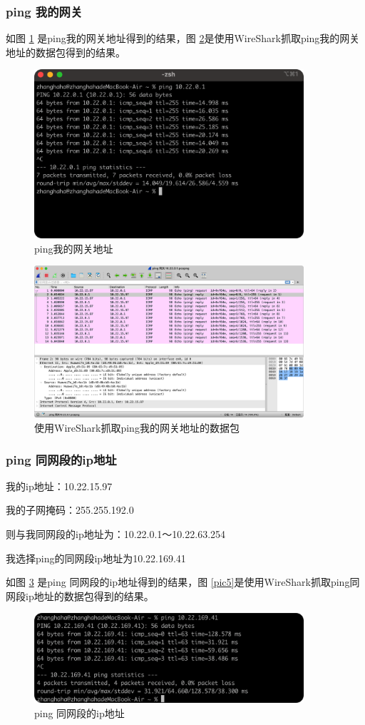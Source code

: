 \documentclass[a4paper,12pt]{report}
\begin{document}
\begin{spacing}{1.5}
\subsubsection{ping 我的网关}
如图 \ref{pic2} 是ping我的网关地址得到的结果，图 \ref{pic3}是使用WireShark抓取ping我的网关地址的数据包得到的结果。
\begin{figure}[htb!]
  \centering
\includegraphics[width=10cm]{figure/ping_gateway.png}
\caption{ping我的网关地址}
\label{pic2}
\end{figure}
\begin{figure}[htb!]
  \centering
\includegraphics[width=10cm]{figure/gateway.png}
\caption{使用WireShark抓取ping我的网关地址的数据包}
\label{pic3}
\end{figure}


\subsubsection{ping 同网段的ip地址}
我的ip地址：10.22.15.97

我的子网掩码：255.255.192.0

则与我同网段的ip地址为：10.22.0.1～10.22.63.254

我选择ping的同网段ip地址为10.22.169.41

如图 \ref{pic4} 是ping 同网段的ip地址得到的结果，图 \ref{pic5}是使用WireShark抓取ping同网段ip地址的数据包得到的结果。
\begin{figure}[htb!]
  \centering
\includegraphics[width=10cm]{figure/pingsame.png}
\caption{ping 同网段的ip地址}
\label{pic4}
\end{figure}


\end{spacing}
\end{document}
